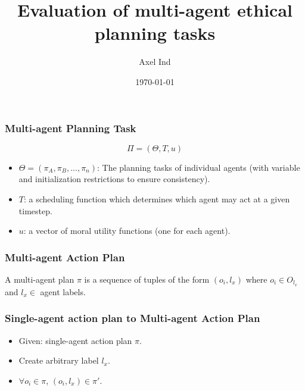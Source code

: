 \documentclass{beamer}
\title{Evaluation of multi-agent ethical planning tasks}
\author{Axel Ind}
\institute{Uni-Freiburg}
\date{\today}
\begin{document}
\frame{\titlepage}

\begin{frame}
\frametitle{Multi-agent Planning Task}
\begin{equation}
\Pi = \left( \Theta, T, u \right)
\end{equation}

\begin{itemize}
\item $\Theta=\left( \pi_A, \pi_B, ... , \pi_n \right)$: The planning tasks of individual agents (with variable and initialization restrictions to ensure consistency).
\item $T$: a scheduling function which determines which agent may act at a given timestep.
\item $u$: a vector of moral utility functions (one for each agent).
\end{itemize}
\end{frame}

\begin{frame}
\frametitle{Multi-agent Action Plan}
\begin{definition}
A multi-agent plan $\pi$ is a sequence of tuples of the form $(o_i,l_x)$ where $o_i \in O_{l_x}$ and $l_x \in $ agent labels.
\end{definition}
\end{frame}

\begin{frame}
\frametitle{Single-agent action plan to Multi-agent Action Plan}
\begin{itemize}
\item Given: single-agent action plan $\pi$.
\item Create arbitrary label $l_x$.
\item $\forall o_i \in \pi$, $(o_i, l_x) \in \pi'$.
\end{itemize}
\end{frame}
 
\end{document}
